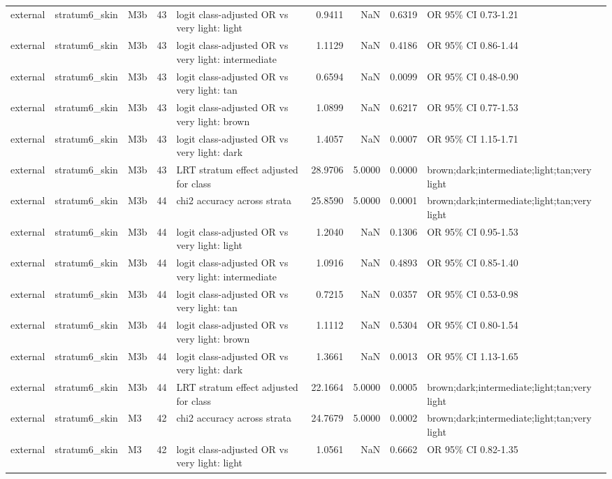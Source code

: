 \begin{tabular}{lllrlrrrl}
external & stratum6\_skin & M3b & 43 & logit class-adjusted OR vs very light: light & 0.9411 & NaN & 0.6319 & OR 95\% CI 0.73-1.21 \\
external & stratum6\_skin & M3b & 43 & logit class-adjusted OR vs very light: intermediate & 1.1129 & NaN & 0.4186 & OR 95\% CI 0.86-1.44 \\
external & stratum6\_skin & M3b & 43 & logit class-adjusted OR vs very light: tan & 0.6594 & NaN & 0.0099 & OR 95\% CI 0.48-0.90 \\
external & stratum6\_skin & M3b & 43 & logit class-adjusted OR vs very light: brown & 1.0899 & NaN & 0.6217 & OR 95\% CI 0.77-1.53 \\
external & stratum6\_skin & M3b & 43 & logit class-adjusted OR vs very light: dark & 1.4057 & NaN & 0.0007 & OR 95\% CI 1.15-1.71 \\
external & stratum6\_skin & M3b & 43 & LRT stratum effect adjusted for class & 28.9706 & 5.0000 & 0.0000 & brown;dark;intermediate;light;tan;very light \\
external & stratum6\_skin & M3b & 44 & chi2 accuracy across strata & 25.8590 & 5.0000 & 0.0001 & brown;dark;intermediate;light;tan;very light \\
external & stratum6\_skin & M3b & 44 & logit class-adjusted OR vs very light: light & 1.2040 & NaN & 0.1306 & OR 95\% CI 0.95-1.53 \\
external & stratum6\_skin & M3b & 44 & logit class-adjusted OR vs very light: intermediate & 1.0916 & NaN & 0.4893 & OR 95\% CI 0.85-1.40 \\
external & stratum6\_skin & M3b & 44 & logit class-adjusted OR vs very light: tan & 0.7215 & NaN & 0.0357 & OR 95\% CI 0.53-0.98 \\
external & stratum6\_skin & M3b & 44 & logit class-adjusted OR vs very light: brown & 1.1112 & NaN & 0.5304 & OR 95\% CI 0.80-1.54 \\
external & stratum6\_skin & M3b & 44 & logit class-adjusted OR vs very light: dark & 1.3661 & NaN & 0.0013 & OR 95\% CI 1.13-1.65 \\
external & stratum6\_skin & M3b & 44 & LRT stratum effect adjusted for class & 22.1664 & 5.0000 & 0.0005 & brown;dark;intermediate;light;tan;very light \\
external & stratum6\_skin & M3 & 42 & chi2 accuracy across strata & 24.7679 & 5.0000 & 0.0002 & brown;dark;intermediate;light;tan;very light \\
external & stratum6\_skin & M3 & 42 & logit class-adjusted OR vs very light: light & 1.0561 & NaN & 0.6662 & OR 95\% CI 0.82-1.35 \\

\end{tabular}
